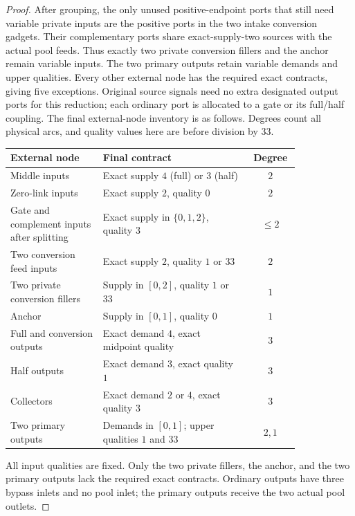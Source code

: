 \begin{proof}
After grouping, the only unused positive-endpoint ports that still
need variable private inputs are the positive ports in the two intake
conversion gadgets. Their complementary ports share exact-supply-two
sources with the actual pool feeds. Thus exactly two private conversion
fillers and the anchor remain variable inputs. The two primary outputs
retain variable demands and upper qualities. Every other external node
has the required exact contracts, giving five exceptions. Original source
signals need no extra designated output ports for this reduction; each
ordinary port is allocated to a gate or its full/half coupling.
The final external-node inventory is as follows. Degrees count all
physical arcs, and quality values here are before division by 33.
\begin{center}
\small
\begin{tabular}{p{0.32\linewidth}p{0.51\linewidth}c}
\toprule
External node & Final contract & Degree\\
\midrule
Middle inputs & Exact supply $4$ (full) or $3$ (half) & $2$\\
Zero-link inputs & Exact supply $2$, quality $0$ & $2$\\
Gate and complement inputs after splitting & Exact supply in
$\{0,1,2\}$, quality $3$ & $\le2$\\
Two conversion feed inputs & Exact supply $2$, quality $1$ or $33$ & $2$\\
Two private conversion fillers & Supply in $[0,2]$, quality $1$ or $33$ & $1$\\
Anchor & Supply in $[0,1]$, quality $0$ & $1$\\
Full and conversion outputs & Exact demand $4$, exact midpoint quality & $3$\\
Half outputs & Exact demand $3$, exact quality $1$ & $3$\\
Collectors & Exact demand $2$ or $4$, exact quality $3$ & $3$\\
Two primary outputs & Demands in $[0,1]$;
upper qualities $1$ and $33$ & $2,1$\\
\bottomrule
\end{tabular}
\end{center}
All input qualities are fixed. Only the two private fillers, the anchor,
and the two primary outputs lack the required exact contracts. Ordinary
outputs have three bypass inlets and no pool inlet; the primary outputs
receive the two actual pool outlets.


\end{proof}
